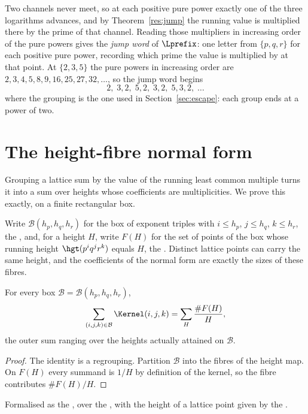 Two channels never meet, so at each positive pure power exactly one of the three
logarithms advances, and by Theorem~\ref{res:jump} the running value is
multiplied there by the prime of that channel.  Reading those multipliers in
increasing order of the pure powers gives the \emph{jump word} of $\Lprefix$:
one letter from $\{p,q,r\}$ for each positive pure power, recording which prime
the value is multiplied by at that point.  At $\{2,3,5\}$ the pure powers in
increasing order are $2,3,4,5,8,9,16,25,27,32,\ldots$, so the jump word begins
\[
 2,\;3,2,\;5,2,\;3,2,\;5,3,2,\;\ldots
\]
where the grouping is the one used in Section~\ref{sec:escape}: each group ends
at a power of two.



\section{The height-fibre normal form}\label{sec:fibre}

Grouping a lattice sum by the value of the running least common multiple turns
it into a sum over heights whose coefficients are multiplicities.  We prove
this exactly, on a finite rectangular box.

Write $\mathcal B(h_p,h_q,h_r)$ for the box of exponent triples with $i\le h_p$,
$j\le h_q$, $k\le h_r$, the
, and, for a height $H$, write $F(H)$ for the set of points of the box whose
running height $\hgt(p^{i}q^{j}r^{k})$ equals $H$, the
.  Distinct lattice points can carry the same height, and the coefficients
of the normal form are exactly the sizes of these fibres.

\begin{theorem}\label{res:fibre}
For every box $\mathcal B=\mathcal B(h_p,h_q,h_r)$,
\[
 \sum_{(i,j,k)\in\mathcal B}\Kernel(i,j,k)
 =\sum_{H}\frac{\#F(H)}{H},
\]
the outer sum ranging over the heights actually attained on $\mathcal B$.
\end{theorem}

\begin{proof}
The identity is a regrouping.  Partition $\mathcal B$ into the fibres of the
height map.  On $F(H)$ every summand is
$1/H$ by definition of the kernel, so the fibre contributes $\#F(H)/H$.
\end{proof}

\noindent Formalised as the
, over the
, with the height of a lattice point given by the
.

